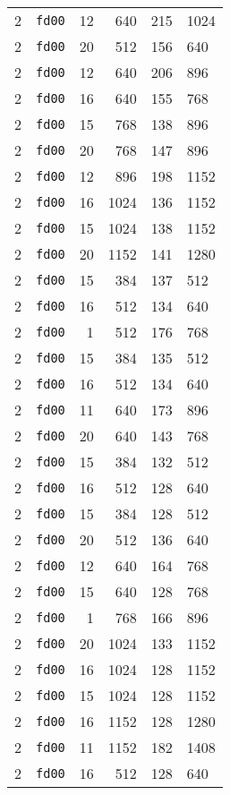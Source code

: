 \documentclass{article}
\begin{document}
\begin{table}[h!]
\begin{tabular}{llrrrl}
    2 & \texttt{fd00} & 12 & 640 & 215 & 1024 \\
    2 & \texttt{fd00} & 20 & 512 & 156 & 640 \\
    2 & \texttt{fd00} & 12 & 640 & 206 & 896 \\
    2 & \texttt{fd00} & 16 & 640 & 155 & 768 \\
    2 & \texttt{fd00} & 15 & 768 & 138 & 896 \\
    2 & \texttt{fd00} & 20 & 768 & 147 & 896 \\
    2 & \texttt{fd00} & 12 & 896 & 198 & 1152 \\
    2 & \texttt{fd00} & 16 & 1024 & 136 & 1152 \\
    2 & \texttt{fd00} & 15 & 1024 & 138 & 1152 \\
    2 & \texttt{fd00} & 20 & 1152 & 141 & 1280 \\
    2 & \texttt{fd00} & 15 & 384 & 137 & 512 \\
    2 & \texttt{fd00} & 16 & 512 & 134 & 640 \\
    2 & \texttt{fd00} & 1 & 512 & 176 & 768 \\
    2 & \texttt{fd00} & 15 & 384 & 135 & 512 \\
    2 & \texttt{fd00} & 16 & 512 & 134 & 640 \\
    2 & \texttt{fd00} & 11 & 640 & 173 & 896 \\
    2 & \texttt{fd00} & 20 & 640 & 143 & 768 \\
    2 & \texttt{fd00} & 15 & 384 & 132 & 512 \\
    2 & \texttt{fd00} & 16 & 512 & 128 & 640 \\
    2 & \texttt{fd00} & 15 & 384 & 128 & 512 \\
    2 & \texttt{fd00} & 20 & 512 & 136 & 640 \\
    2 & \texttt{fd00} & 12 & 640 & 164 & 768 \\
    2 & \texttt{fd00} & 15 & 640 & 128 & 768 \\
    2 & \texttt{fd00} & 1 & 768 & 166 & 896 \\
    2 & \texttt{fd00} & 20 & 1024 & 133 & 1152 \\
    2 & \texttt{fd00} & 16 & 1024 & 128 & 1152 \\
    2 & \texttt{fd00} & 15 & 1024 & 128 & 1152 \\
    2 & \texttt{fd00} & 16 & 1152 & 128 & 1280 \\
    2 & \texttt{fd00} & 11 & 1152 & 182 & 1408 \\
    2 & \texttt{fd00} & 16 & 512 & 128 & 640 \\

\end{tabular}
\end{table}
\end{document}
